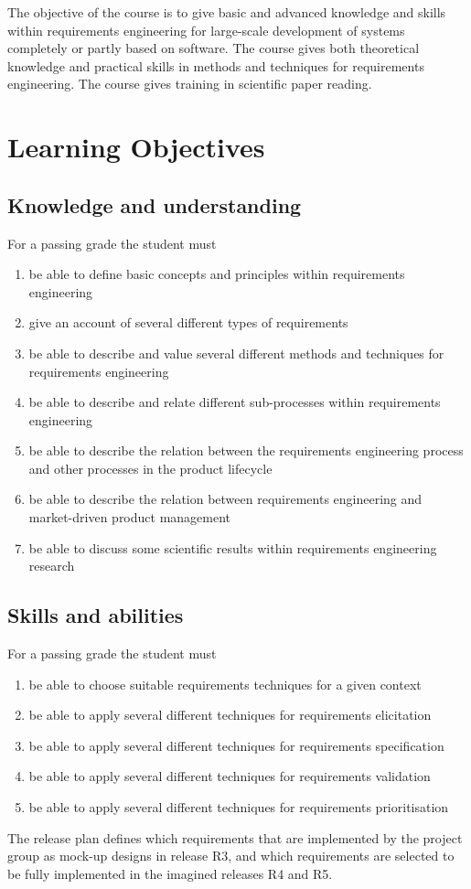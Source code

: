 \maketitle
\noindent 
The objective of the course is to give basic and advanced knowledge and skills within requirements engineering for large-scale development of systems completely or partly based on software. The course gives both theoretical knowledge and practical skills in methods and techniques for requirements engineering. The course gives training in scientific paper reading.

\section{Learning Objectives}
\subsection{Knowledge and understanding}
For a passing grade the student must
\begin{enumerate}[noitemsep]
\item be able to define basic concepts and principles within requirements engineering 
\item give an account of several different types of requirements
\item be able to describe and value several different methods and techniques for requirements engineering
\item be able to describe and relate different sub-processes within requirements engineering
\item be able to describe the relation between the requirements engineering process and other processes in the product lifecycle
\item be able to describe the relation between requirements engineering and market-driven product management
\item be able to discuss some scientific results within requirements engineering research
\end{enumerate}


\subsection{Skills and abilities}
For a passing grade the student must
\begin{enumerate}[noitemsep]
\item be able to choose suitable requirements techniques for a given context
\item     be able to apply several different techniques for requirements elicitation
\item     be able to apply several different techniques for requirements specification
\item     be able to apply several different techniques for requirements validation
\item     be able to apply several different techniques for requirements prioritisation
\end{enumerate}
  The release plan defines which requirements that are implemented by the project group as mock-up designs in release R3, and which requirements are selected to be fully implemented in the imagined releases R4 and R5. 
